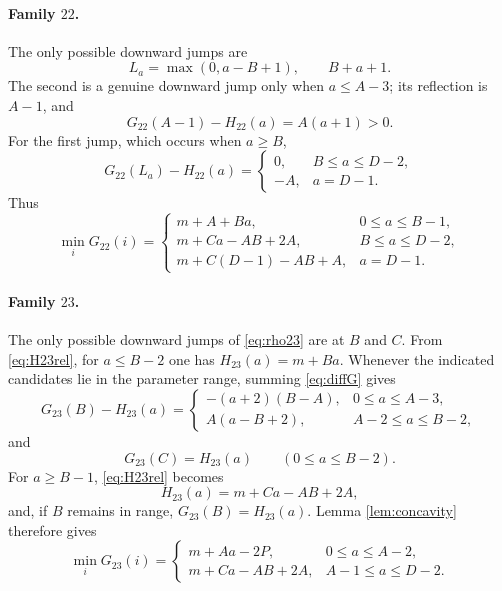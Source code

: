 \documentclass[11pt]{amsart}
\begin{document}
\paragraph{Family $22$.}
The only possible downward jumps are
\[
 L_a=\max(0,a-B+1),\qquad B+a+1.
\]
The second is a genuine downward jump only when $a\le A-3$; its reflection is $A-1$, and
\begin{equation}\label{eq:22jump2}
 G_{22}(A-1)-H_{22}(a)=A(a+1)>0.
\end{equation}
For the first jump, which occurs when $a\ge B$,
\begin{equation}\label{eq:22jump1}
 G_{22}(L_a)-H_{22}(a)=
\begin{cases}
 0,&B\le a\le D-2,\\
 -A,&a=D-1.
\end{cases}
\end{equation}
Thus
\begin{equation}\label{eq:min22}
\min_iG_{22}(i)=
\begin{cases}
 m+A+Ba,&0\le a\le B-1,\\
 m+Ca-AB+2A,&B\le a\le D-2,\\
 m+C(D-1)-AB+A,&a=D-1.
\end{cases}
\end{equation}

\paragraph{Family $23$.}
The only possible downward jumps of \eqref{eq:rho23} are at $B$ and $C$.  From \eqref{eq:H23rel}, for $a\le B-2$ one has $H_{23}(a)=m+Ba$.  Whenever the indicated candidates lie in the parameter range, summing \eqref{eq:diffG} gives
\begin{equation}\label{eq:23B}
 G_{23}(B)-H_{23}(a)=
\begin{cases}
 -(a+2)(B-A),&0\le a\le A-3,\\
 A(a-B+2),&A-2\le a\le B-2,
\end{cases}
\end{equation}
and
\begin{equation}\label{eq:23C}
 G_{23}(C)=H_{23}(a)\qquad(0\le a\le B-2).
\end{equation}
For $a\ge B-1$, \eqref{eq:H23rel} becomes
\[
 H_{23}(a)=m+Ca-AB+2A,
\]
and, if $B$ remains in range, $G_{23}(B)=H_{23}(a)$.  Lemma \ref{lem:concavity} therefore gives
\begin{equation}\label{eq:min23}
\min_iG_{23}(i)=
\begin{cases}
 m+Aa-2P,&0\le a\le A-2,\\
 m+Ca-AB+2A,&A-1\le a\le D-2.
\end{cases}
\end{equation}
\end{document}
